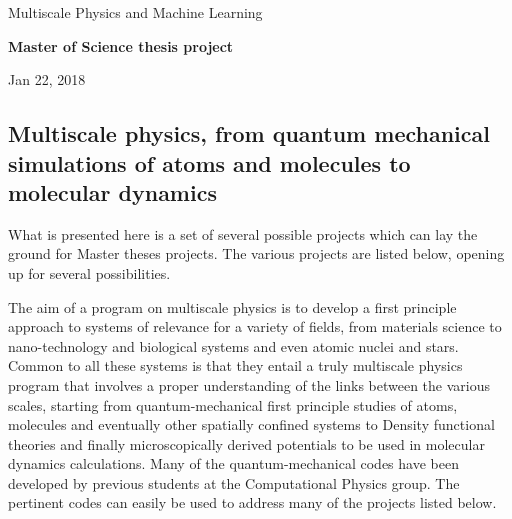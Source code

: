 \documentclass[%
oneside,                 %
final,                   %
10pt]{article}
\begin{document}

\newcommand{\exercisesection}[1]{\subsection*{#1}}






\thispagestyle{empty}

\begin{center}
{\LARGE\bf
\begin{spacing}{1.25}
Multiscale Physics and Machine Learning
\end{spacing}
}
\end{center}


\begin{center}
{\bf Master of Science thesis project${}^{}$} \\ [0mm]
\end{center}

\begin{center}
\end{center}
    

\begin{center}
Jan 22, 2018
\end{center}

\vspace{1cm}


\subsection{Multiscale physics, from quantum mechanical simulations of atoms and molecules to molecular dynamics}

What is presented here is a set of several possible  projects which can lay the ground for 
Master theses projects.  The various projects are listed below,
opening up for several possibilities.

The aim of a program on multiscale physics is to develop a first
principle approach to systems of relevance for a variety of fields,
from materials science to nano-technology and biological systems and
even atomic nuclei and stars.  Common to all these systems is that
they entail a truly multiscale physics program that involves a proper
understanding of the links between the various scales, starting from
quantum-mechanical first principle studies of atoms, molecules and
eventually other spatially confined systems to Density functional
theories and finally microscopically derived potentials to be used in
molecular dynamics calculations. Many of the quantum-mechanical codes have been developed by previous 
students at the Computational Physics group. The pertinent codes can easily be used to address many of the projects listed below.
\end{document}
